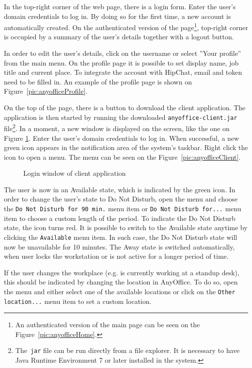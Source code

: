 \documentclass[11pt,singleside]{myfithesis2}
\newcommand{\pict}[4]{
	\begin{figure}[h!]
  		\vspace{-7px}
  		\centerline{\fcolorbox{darkgray}{palegray}{\texttt{[image: \#2]}}}
  		\caption{#1}
  		\label{#4}
	\end{figure}
}
\begin{document}
In the top-right corner of the web page, there is a login form. Enter the user's domain credentials to log in. By doing so for the first time, a new account is automatically created. On the authenticated version of the page\footnote{An authenticated version of the main page can be seen on the Figure~\ref{pic:anyofficeHome}.}, top-right corner is occupied by a summary of the user's details together with a logout button. 

In order to edit the user's details, click on the username or select ''Your profile'' from the main menu. On the profile page it is possible to set display name, job title and current place. To integrate the account with HipChat, email and token need to be filled in. An example of the profile page is shown on Figure~\ref{pic:anyofficeProfile}.

On the top of the page, there is a button to download the client application. The application is then started by running the downloaded \texttt{anyoffice-client.jar} file\footnote{The~\texttt{jar} file can be run directly from a file explorer.  It is necessary to have Java Runtime Environment 7 or later installed in the system.}. In a moment, a new window is displayed on the screen, like the one on Figure \ref{pic:loginWindow}. Enter the user's domain credentials to log in. When successful, a new green icon appears in the notification area of the system's taskbar. Right click the icon to open a menu. The menu can be seen on the Figure~\ref{pic:anyofficeClient}.
\pict{Login window of client application}{data/loginWindow.png}{width=0.5\textwidth}{pic:loginWindow} 

The user is now in an Available state, which is indicated by the green icon. In order to change the user's state to Do Not Disturb, open the menu and choose the \texttt{Do Not Disturb for 90 min.} menu item or \texttt{Do Not Disturb for...} menu item to choose a custom length of the period. To indicate the Do Not Disturb state, the icon turns red. It is possible to switch to the Available state anytime by clicking the \texttt{Available} menu item. In such case, the Do Not Disturb state will now be unavailable for 10 minutes. The Away state is switched automatically, when user locks the workstation or is not active for a longer period of time.

If the user changes the workplace (e.g. is currently working at a standup desk), this should be indicated by changing the location in AnyOffice. To do so, open the menu and either select one of the available locations or click on the \texttt{Other location...} menu item to set a custom location.
\end{document}
